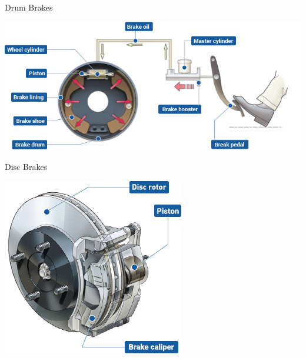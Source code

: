 \documentclass[10pt, svgnames]{beamer}
\begin{document}
\begin{frame}[label={sec:org9e3811c}]{Drum Brakes}
\begin{center}
\includegraphics[width=\textwidth]{./pictures/drum-brake.png}
\end{center}
\end{frame}

\begin{frame}[label={sec:orgcb6c0a4}]{Disc Brakes}
\begin{center}
\includegraphics[height=0.9\textheight]{./pictures/disc-brake.png}
\end{center}
\end{frame}
\end{document}

